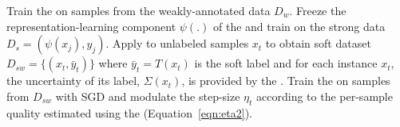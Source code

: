 \setlength{\textfloatsep}{10pt}
\begin{algorithm}[t!]
\small
\caption{\fwlfull.}%
\begin{algorithmic}[1]
\State Train the \std on samples from the weakly-annotated data $D_w$.
\medskip
\State Freeze the representation-learning component $\psi(.)$ of the \std and train \tch on the strong data $D_s={(\psi(x_j),y_j)}$. Apply \tch to unlabeled samples $x_t$ to obtain soft dataset $D_{sw}=\{(x_t, \bar{y}_t)\}$ where $\bar{y}_t=T(x_t)$ is the soft label and for each instance $x_t$, the uncertainty of its label, $\Sigma(x_t)$, is provided by the \tch.
\medskip
\State Train the \std on samples from $D_{sw}$ with SGD and modulate the step-size $\eta_t$ according to the per-sample quality estimated using the \tch (Equation~\ref{eqn:eta2}).
\end{algorithmic}
\label{alg:fwl:main}
\end{algorithm}
